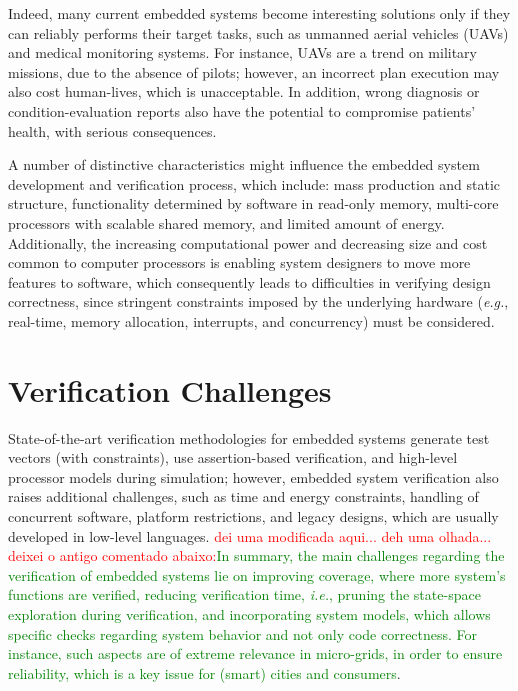 \documentclass{acm_sen_article}
\begin{document}
Indeed, many current embedded systems become interesting solutions only if they can reliably
performs their target tasks, such as unmanned aerial vehicles (UAVs) and medical monitoring systems. For instance, UAVs are a trend on military missions, due to the absence of pilots; however, an incorrect plan execution may also cost human-lives, which is unacceptable. In addition, wrong diagnosis or condition-evaluation reports also have the potential to compromise patients' health, with serious consequences.


A number of distinctive characteristics might influence the embedded system development and verification process, which include: mass production and static structure, functionality determined by software in read-only memory, multi-core processors with scalable shared memory, and limited amount of energy. Additionally, the increasing computational power and decreasing size and cost common to computer processors is enabling system designers to move more features to software, which consequently leads to difficulties in verifying design correctness, since stringent constraints imposed by the underlying hardware ({\it e.g.}, real-time, memory allocation, interrupts, and concurrency) must be considered.

\section{Verification Challenges}

State-of-the-art verification methodologies for embedded systems generate test vectors (with constraints), use assertion-based verification, and high-level processor models during simulation; however, embedded system verification also raises additional challenges, such as time and energy constraints, handling of concurrent software, platform restrictions, and legacy designs, which are usually developed in low-level languages. \textcolor{red}{dei uma modificada aqui... deh uma olhada... deixei o antigo comentado abaixo:}\textcolor{green}{In summary, the main challenges regarding the verification of embedded systems lie on improving coverage, where more system's functions are verified, reducing verification time, {\it i.e.}, pruning the state-space exploration during verification, and incorporating system models, which allows specific checks regarding system behavior and not only code correctness. For instance, such aspects are of extreme relevance in micro-grids, in order to ensure reliability, which is a key issue for (smart) cities and consumers}.
\end{document}
